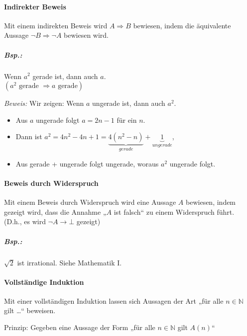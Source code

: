 \paragraph{Indirekter Beweis} Mit einem indirekten Beweis wird $A\Rightarrow B$ bewiesen, indem die äquivalente Aussage $\neg B \Rightarrow \neg A$ bewiesen wird.

\subparagraph{Bsp.:} Wenn $a^2$ gerade ist, dann auch $a$.\\
$(a^2 \text{ gerade } \Rightarrow a \text{ gerade})$

\emph{Beweis:} Wir zeigen: Wenn $a$ ungerade ist, dann auch $a^2$.
\begin{itemize}
\item Aus $a$ ungerade folgt $a=2n-1$ für ein $n$. 
\item Dann ist $a^2=4 n^2 - 4 n + 1 = \underbrace{4( n^2-n)}_{gerade} + \underbrace{1}_{ungerade}$, 
\item Aus gerade + ungerade folgt ungerade, woraus $a^2$ ungerade folgt.
\end{itemize}

\paragraph{Beweis durch Widerspruch} Mit einem Beweis durch Widerspruch wird eine Aussage $A$ bewiesen, indem gezeigt wird, dass die Annahme „$A$ ist falsch“ zu einem Widerspruch führt.\\
(D.h., es wird $\neg A \rightarrow \bot$ gezeigt)

\subparagraph{Bsp.:} $\sqrt{2}$ ist irrational. Siehe Mathematik I.

\paragraph{Vollständige Induktion} Mit einer vollständigen Induktion lassen sich Aussagen der Art „für alle $n \in \mathbb{N}$ gilt …“ beweisen.

Prinzip: Gegeben eine Aussage der Form „für alle $n \in \mathbb{N}$ gilt $A(n)$“

